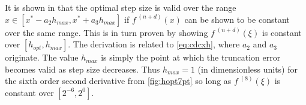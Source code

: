 It is shown in  that the optimal step size is valid over the range $x \in [x^*-a_2h_{max},x^*+a_3h_{max}]$ if $f^{\;(n+d)}(x)$ can be shown to be constant over the same range.
This is in turn proven by showing $f^{\;(n+d)}(\xi)$ is constant over $[h_{opt},h_{max}]$.
The derivation is related to \cref{eq:cdcxh}, where $a_2$ and $a_3$ originate.
The value $h_{max}$ is simply the point at which the truncation error becomes valid as step size decreases.
Thus $h_{max} = 1$ (in dimensionless units) for the sixth order second derivative from \cref{fig:hopt7pt} so long as $f^{\;(8)}(\xi)$ is constant over $[2^{-6},2^{0}]$. 


